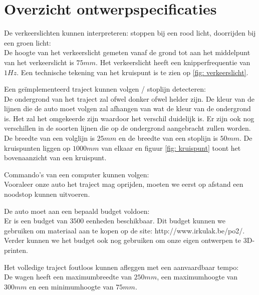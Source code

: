 \documentclass[12pt]{article}
\begin{document}



\section*{Overzicht ontwerpspecificaties}
De verkeerslichten kunnen interpreteren: stoppen bij een rood licht, doorrijden bij een groen licht:\\
De hoogte van het verkeerslicht gemeten vanaf de grond tot aan het middelpunt van het verkeerslicht is $75mm$. Het verkeerslicht heeft een knipperfrequentie van $1Hz$. Een technische tekening van het kruispunt is te zien op \ref{fig: verkeerslicht}.
\bigskip



Een geïmplementeerd traject kunnen volgen / stoplijn detecteren:\\
De ondergrond van het traject zal ofwel donker ofwel helder zijn. De kleur van de lijnen die de auto moet volgen zal afhangen van wat de kleur van de ondergrond is. Het zal het omgekeerde zijn waardoor het verschil duidelijk is. Er zijn ook nog verschillen in de soorten lijnen die op de ondergrond aangebracht zullen worden. De breedte van een volglijn is $25mm$ en de breedte van een stoplijn is $50mm$. De kruispunten liggen op $1000mm$ van elkaar en figuur \ref{fig: kruispunt} toont het bovenaanzicht van een kruispunt. 


\bigskip


Commando's van een computer kunnen volgen:\\
Vooraleer onze auto het traject mag oprijden, moeten we eerst op afstand een noodstop kunnen uitvoeren. 



\bigskip

De auto moet aan een bepaald budget voldoen:\\
Er is een budget van $3500$ eenheden beschikbaar. Dit budget kunnen we gebruiken om materiaal aan te kopen op de site: http://www.irkulak.be/po2/.
Verder kunnen we het budget ook nog gebruiken om onze eigen ontwerpen te 3D-printen. 

\bigskip
Het volledige traject foutloos kunnen afleggen met een aanvaardbaar tempo:\\
De wagen heeft een maximumbreedte van $250mm$, een maximumhoogte van $300mm$ en een minimumhoogte van $75mm$.

\bigskip
\end{document}
